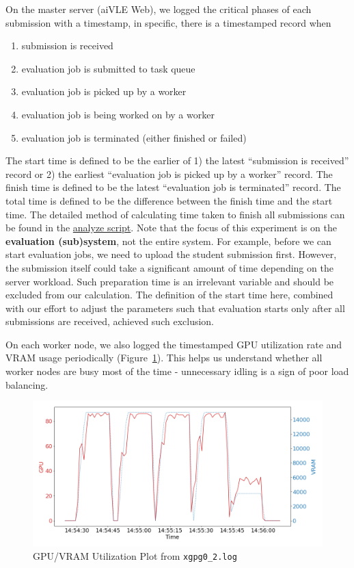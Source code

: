 On the master server (aiVLE Web), we logged the critical phases of each submission with a timestamp, in specific, there is a timestamped record when
\begin{enumerate}
    \item submission is received
    \item evaluation job is submitted to task queue
    \item evaluation job is picked up by a worker
    \item evaluation job is being worked on by a worker
    \item evaluation job is terminated (either finished or failed)
\end{enumerate}

The start time is defined to be the earlier of 1) the latest ``submission is received'' record or 2) the earliest ``evaluation job is picked up by a worker'' record. The finish time is defined to be the latest ``evaluation job is terminated'' record. The total time is defined to be the difference between the finish time and the start time. The detailed method of calculating time taken to finish all submissions can be found in the \href{https://github.com/edu-ai/aivle-experiment-logs/blob/main/web/analyze.ipynb}{analyze script}. Note that the focus of this experiment is on the \textbf{evaluation (sub)system}, not the entire system. For example, before we can start evaluation jobs, we need to upload the student submission first. However, the submission itself could take a significant amount of time depending on the server workload. Such preparation time is an irrelevant variable and should be excluded from our calculation. The definition of the start time here, combined with our effort to adjust the parameters such that evaluation starts only after all submissions are received, achieved such exclusion.

On each worker node, we also logged the timestamped GPU utilization rate and VRAM usage periodically (Figure~\ref{fig:experiment-lb-utilization-plot}). This helps us understand whether all worker nodes are busy most of the time - unnecessary idling is a sign of poor load balancing.

\begin{figure}[H]
    \centering
    \includegraphics[width=\textwidth]{images/worker-utilization.png}
    \caption{GPU/VRAM Utilization Plot from \texttt{xgpg0\_2.log}}
    \label{fig:experiment-lb-utilization-plot}
\end{figure}

